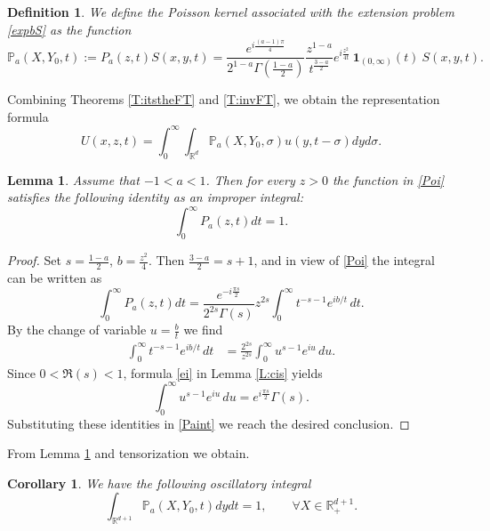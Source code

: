 \documentclass[11pt,letter]{amsart}
\def \RNu {\mathbb{R}^{d+1}}
\def \RN {\mathbb{R}_+^{d+1}}
\newcommand{\Rd}{\mathbb R^d}
\numberwithin{equation}{section}
\newtheorem{lemma}[theorem]{Lemma}
\newtheorem{corollary}[theorem]{Corollary}
\newtheorem{definition}[theorem]{Definition}
\numberwithin{equation}{section}
\begin{document}
\begin{definition}\label{D:Pa}
We define the \emph{Poisson kernel} associated with the extension problem  \eqref{expbS} as the function
\begin{equation}\label{Pa}
\mathbb P_a(X,Y_0,t) := P_a(z,t) S(x,y,t)
= \frac{e^{i\frac{(a-1)\pi}{4}}}
     {2^{1-a}\Gamma\!\left(\frac{1-a}{2}\right)}
\frac{z^{1-a}}{t^{\frac{3-a}{2}}}
e^{i\frac{z^2}{4t}}\ \mathbf 1_{(0,\infty)}(t)\ S(x,y,t).
\end{equation}
\end{definition}

Combining Theorems \ref{T:itstheFT} and \ref{T:invFT}, we obtain the representation formula
\begin{equation}\label{U2}
U(x,z,t) = \int_0^\infty \int_{\Rd} \mathbb P_a(X,Y_0,\sigma) u(y,t-\sigma) dy d\sigma.
\end{equation}


\begin{lemma}\label{L:Paone}
Assume that $-1<a<1$. Then for every $z>0$ the function in \eqref{Poi} satisfies the following identity as an improper integral:
\[
\int_0^\infty P_a(z,t) dt
=
1.
\]
\end{lemma}

\begin{proof}
Set $s=\frac{1-a}{2}$,
$b=\frac{z^2}{4}$.
Then $\frac{3-a}{2}=s+1$,
and in view of \eqref{Poi} the integral can be written as
\begin{equation}\label{Paint}
\int_0^\infty P_a(z,t) dt =
\frac{e^{-i\frac{\pi s}{2}}}
     {2^{2s}\Gamma(s)}
z^{2s}
\int_0^\infty t^{-s-1}e^{i b/t}\,dt.
\end{equation}
By the change of variable
$u=\frac{b}{t}$ we find
\begin{align*}
\int_0^\infty t^{-s-1}e^{ib/t}\,dt
&=
\frac{2^{2s}}{z^{2s}}
\int_0^\infty u^{s-1}e^{iu}\,du.
\end{align*}
Since $0<\Re(s)<1$, formula \eqref{ei} in Lemma \ref{L:cis} yields
\[
\int_0^\infty u^{s-1}e^{iu}\,du
=
e^{i\frac{\pi s}2}\Gamma(s).
\]
Substituting these identities in \eqref{Paint} we reach the desired conclusion.


\end{proof}


From Lemma \ref{L:Paone} and tensorization we obtain.
 
\begin{corollary}\label{C:Paone}
We have the following oscillatory integral
\begin{equation}\label{intPa}
\int_{\RNu} \mathbb P_a(X,Y_0,t) dy dt = 1,\ \ \ \ \ \ \ \ \ \forall X\in \RN.
\end{equation} 
\end{corollary}
\end{document}
